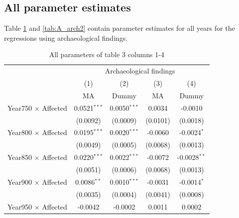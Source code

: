 \newpage
\subsection{All parameter estimates}
Table \ref{tab:A_arch1} and \ref{tab:A_arch2} contain parameter estimates for all years for the regressions using archaeological findings. 

\begin{table}[H]
\centering
\footnotesize
\caption{All parameters of table 3 columns 1-4} \label{tab:A_arch1}
\begin{tabular}{lcccc}
   \tabularnewline \midrule \midrule
                                                    & \multicolumn{4}{c}{Archaeological findings}\\
                                                    & (1)             & (2)             & (3)                   & (4)\\  
                                                    & MA              & Dummy           & MA                    & Dummy\\
   \midrule
   Year750 $\times$ Affected                        & 0.0521$^{***}$  & 0.0050$^{***}$  & 0.0034                & -0.0010\\   
                                                    & (0.0092)        & (0.0009)        & (0.0101)              & (0.0018)\\   
   Year800 $\times$ Affected                        & 0.0195$^{***}$  & 0.0020$^{***}$  & -0.0060               & -0.0024$^{*}$\\   
                                                    & (0.0049)        & (0.0005)        & (0.0068)              & (0.0013)\\   
   Year850 $\times$ Affected                        & 0.0220$^{***}$  & 0.0022$^{***}$  & -0.0072               & -0.0028$^{**}$\\   
                                                    & (0.0051)        & (0.0006)        & (0.0068)              & (0.0013)\\   
   Year900 $\times$ Affected                        & 0.0086$^{**}$   & 0.0010$^{***}$  & -0.0031               & -0.0014$^{*}$\\   
                                                    & (0.0035)        & (0.0004)        & (0.0041)              & (0.0008)\\   
   Year950 $\times$ Affected                        & -0.0042         & -0.0002         & 0.0011                & 0.0002\\   

\end{tabular}
\end{table}
